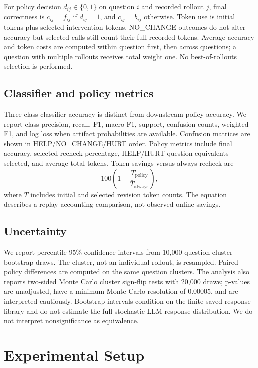 \documentclass[conference]{IEEEtran}
\begin{document}
For policy decision $d_{ij}\in\{0,1\}$ on question $i$ and recorded rollout $j$, final correctness is $c_{ij}=f_{ij}$ if $d_{ij}=1$, and $c_{ij}=b_{ij}$ otherwise. Token use is initial tokens plus selected intervention tokens. NO\_CHANGE outcomes do not alter accuracy but selected calls still count their full recorded tokens. Average accuracy and token costs are computed within question first, then across questions; a question with multiple rollouts receives total weight one. No best-of-rollouts selection is performed.

\subsection{Classifier and policy metrics}
Three-class classifier accuracy is distinct from downstream policy accuracy. We report class precision, recall, F1, macro-F1, support, confusion counts, weighted-F1, and log loss when artifact probabilities are available. Confusion matrices are shown in HELP/NO\_CHANGE/HURT order. Policy metrics include final accuracy, selected-recheck percentage, HELP/HURT question-equivalents selected, and average total tokens. Token savings versus always-recheck are
\begin{equation}
  100\left(1-\frac{\bar T_{\mathrm{policy}}}{\bar T_{\mathrm{always}}}\right),
\end{equation}
where $\bar T$ includes initial and selected revision token counts. The equation describes a replay accounting comparison, not observed online savings.

\subsection{Uncertainty}
We report percentile 95\% confidence intervals from 10,000 question-cluster bootstrap draws. The cluster, not an individual rollout, is resampled. Paired policy differences are computed on the same question clusters. The analysis also reports two-sided Monte Carlo cluster sign-flip tests with 20,000 draws; p-values are unadjusted, have a minimum Monte Carlo resolution of $0.00005$, and are interpreted cautiously. Bootstrap intervals condition on the finite saved response library and do not estimate the full stochastic LLM response distribution. We do not interpret nonsignificance as equivalence.

\section{Experimental Setup}
\end{document}
